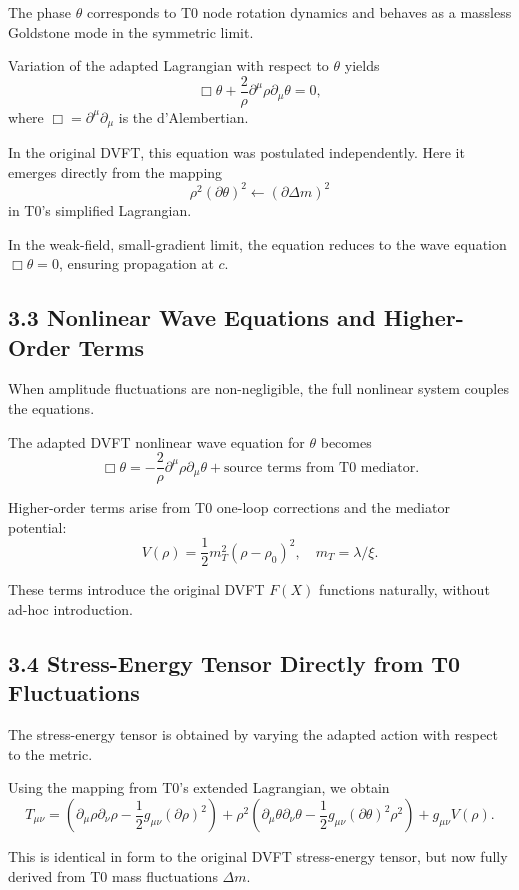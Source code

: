 	The phase $\theta$ corresponds to T0 node rotation dynamics and behaves as a massless Goldstone mode in the symmetric limit.
	
	Variation of the adapted Lagrangian with respect to $\theta$ yields
	\[
	\Box \theta + \frac{2}{\rho} \partial^\mu \rho \partial_\mu \theta = 0,
	\]
	where $\Box = \partial^\mu \partial_\mu$ is the d'Alembertian.
	
	In the original DVFT, this equation was postulated independently. Here it emerges directly from the mapping
	\[
	\rho^2 (\partial \theta)^2 \leftarrow (\partial \Delta m)^2
	\]
	in T0's simplified Lagrangian.
	
	In the weak-field, small-gradient limit, the equation reduces to the wave equation $\Box \theta = 0$, ensuring propagation at $c$.
	
	\subsection{3.3 Nonlinear Wave Equations and Higher-Order Terms}
	
	When amplitude fluctuations are non-negligible, the full nonlinear system couples the equations.
	
	The adapted DVFT nonlinear wave equation for $\theta$ becomes
	\[
	\Box \theta = -\frac{2}{\rho} \partial^\mu \rho \partial_\mu \theta + \text{source terms from T0 mediator}.
	\]
	
	Higher-order terms arise from T0 one-loop corrections and the mediator potential:
	\[
	V(\rho) = \frac{1}{2} m_T^2 (\rho - \rho_0)^2, \quad m_T = \lambda / \xi.
	\]
	
	These terms introduce the original DVFT $F(X)$ functions naturally, without ad-hoc introduction.
	
	\subsection{3.4 Stress-Energy Tensor Directly from T0 Fluctuations}
	
	The stress-energy tensor is obtained by varying the adapted action with respect to the metric.
	
	Using the mapping from T0's extended Lagrangian, we obtain
	\[
	T_{\mu\nu} = (\partial_\mu \rho \partial_\nu \rho - \frac{1}{2} g_{\mu\nu} (\partial \rho)^2) + \rho^2 (\partial_\mu \theta \partial_\nu \theta - \frac{1}{2} g_{\mu\nu} (\partial \theta)^2 \rho^2) + g_{\mu\nu} V(\rho).
	\]
	
	This is identical in form to the original DVFT stress-energy tensor, but now fully derived from T0 mass fluctuations $\Delta m$.
	
